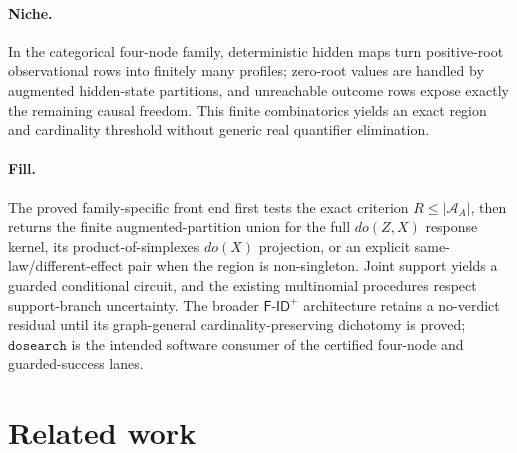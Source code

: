 \documentclass{article}
\begin{document}
\paragraph{Niche.} In the categorical four-node family, deterministic hidden maps turn positive-root observational rows into finitely many profiles; zero-root values are handled by augmented hidden-state partitions, and unreachable outcome rows expose exactly the remaining causal freedom.  This finite combinatorics yields an exact region and cardinality threshold without generic real quantifier elimination.

\paragraph{Fill.} The proved family-specific front end first tests the exact criterion \(R\leq|\mathcal A_A|\), then returns the finite augmented-partition union for the full \(do(Z,X)\) response kernel, its product-of-simplexes \(do(X)\) projection, or an explicit same-law/different-effect pair when the region is non-singleton.  Joint support yields a guarded conditional circuit, and the existing multinomial procedures respect support-branch uncertainty.  The broader \(\mathsf{F\text{-}ID}^{+}\) architecture retains a no-verdict residual until its graph-general cardinality-preserving dichotomy is proved; \(\texttt{dosearch}\) is the intended software consumer of the certified four-node and guarded-success lanes.

\section{Related work}
\end{document}
